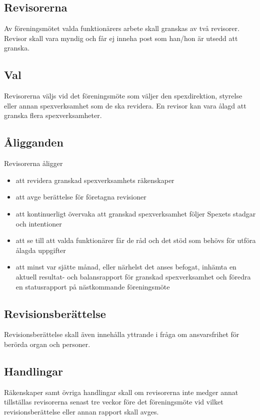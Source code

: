 \documentclass[a4paper]{article}
\begin{document}
\subsection{Revisorerna}
Av föreningsmötet valda funktionärers arbete skall granskas av två revisorer. Revisor skall vara myndig och får ej inneha post som han/hon är utsedd att granska.

\subsection{Val}
Revisorerna väljs vid det föreningsmöte som väljer den spexdirektion, styrelse eller annan spexverksamhet som de ska revidera. En revisor kan vara ålagd att granska flera spexverksamheter.

\subsection{Åligganden}
Revisorerna åligger

\begin{itemize}
  \item att revidera granskad spexverksamhets räkenskaper
  \item att avge berättelse för företagna revisioner
  \item att kontinuerligt övervaka att granskad spexverksamhet följer Spexets stadgar och intentioner
  \item att se till att valda funktionärer får de råd och det stöd som behövs för utföra ålagda uppgifter
  \item att minst var sjätte månad, eller närhelst det anses befogat, inhämta en aktuell resultat- och balansrapport för granskad spexverksamhet och föredra en statusrapport på nästkommande föreningsmöte
\end{itemize}

\subsection{Revisionsberättelse}
Revisionsberättelse skall även innehålla yttrande i fråga om ansvarsfrihet för berörda organ och personer.

\subsection{Handlingar}
Räkenskaper samt övriga handlingar skall om revisorerna inte medger annat tillställas revisorerna senast tre veckor före det föreningsmöte vid vilket revisionsberättelse eller annan rapport skall avges.
\end{document}
